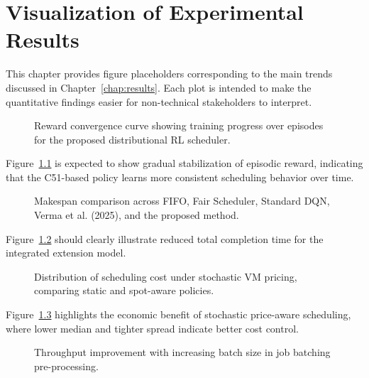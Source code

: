\chapter{Visualization of Experimental Results}
\label{chap:visualization}

This chapter provides figure placeholders corresponding to the main trends discussed in Chapter~\ref{chap:results}. Each plot is intended to make the quantitative findings easier for non-technical stakeholders to interpret.

\begin{figure}[H]
\centering
{}
\caption{Reward convergence curve showing training progress over episodes for the proposed distributional RL scheduler.}
\label{fig:reward_convergence}
\end{figure}

Figure~\ref{fig:reward_convergence} is expected to show gradual stabilization of episodic reward, indicating that the C51-based policy learns more consistent scheduling behavior over time.

\begin{figure}[H]
\centering
{}
\caption{Makespan comparison across FIFO, Fair Scheduler, Standard DQN, Verma et al. (2025), and the proposed method.}
\label{fig:makespan_comparison}
\end{figure}

Figure~\ref{fig:makespan_comparison} should clearly illustrate reduced total completion time for the integrated extension model.

\begin{figure}[H]
\centering
{}
\caption{Distribution of scheduling cost under stochastic VM pricing, comparing static and spot-aware policies.}
\label{fig:cost_distribution}
\end{figure}

Figure~\ref{fig:cost_distribution} highlights the economic benefit of stochastic price-aware scheduling, where lower median and tighter spread indicate better cost control.

\begin{figure}[H]
\centering
{}
\caption{Throughput improvement with increasing batch size in job batching pre-processing.}
\label{fig:batching_throughput}
\end{figure}

